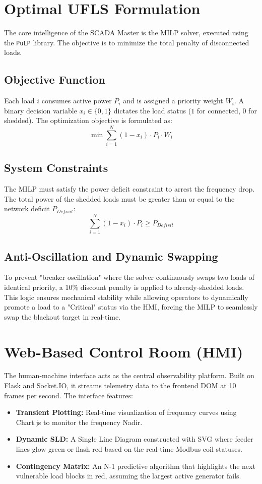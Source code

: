 \documentclass[conference]{IEEEtran}
\begin{document}
\section{Optimal UFLS Formulation}
The core intelligence of the SCADA Master is the MILP solver, executed using the \texttt{PuLP} library. The objective is to minimize the total penalty of disconnected loads.

\subsection{Objective Function}
Each load $i$ consumes active power $P_i$ and is assigned a priority weight $W_i$. A binary decision variable $x_i \in \{0, 1\}$ dictates the load status ($1$ for connected, $0$ for shedded). The optimization objective is formulated as:
\begin{equation}
\min \sum_{i=1}^{N} (1 - x_i) \cdot P_i \cdot W_i \label{eq:objective}
\end{equation}

\subsection{System Constraints}
The MILP must satisfy the power deficit constraint to arrest the frequency drop. The total power of the shedded loads must be greater than or equal to the network deficit $P_{Defisit}$:
\begin{equation}
\sum_{i=1}^{N} (1 - x_i) \cdot P_i \ge P_{Defisit} \label{eq:constraint}
\end{equation}

\subsection{Anti-Oscillation and Dynamic Swapping}
To prevent "breaker oscillation" where the solver continuously swaps two loads of identical priority, a 10\% discount penalty is applied to already-shedded loads. This logic ensures mechanical stability while allowing operators to dynamically promote a load to a "Critical" status via the HMI, forcing the MILP to seamlessly swap the blackout target in real-time.

\section{Web-Based Control Room (HMI)}
The human-machine interface acts as the central observability platform. Built on Flask and Socket.IO, it streams telemetry data to the frontend DOM at 10 frames per second. 
The interface features:
\begin{itemize}
\item \textbf{Transient Plotting:} Real-time visualization of frequency curves using Chart.js to monitor the frequency Nadir.
\item \textbf{Dynamic SLD:} A Single Line Diagram constructed with SVG where feeder lines glow green or flash red based on the real-time Modbus coil statuses.
\item \textbf{Contingency Matrix:} An N-1 predictive algorithm that highlights the next vulnerable load blocks in red, assuming the largest active generator fails.
\end{itemize}
\end{document}
